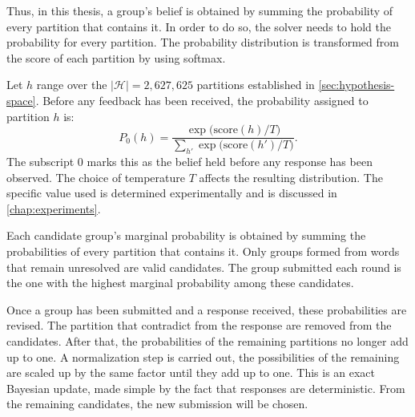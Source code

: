 Thus, in this thesis, a group's belief is obtained by summing the probability of every partition that contains it. In order to do so, the solver needs to hold the probability for every partition. The probability distribution is transformed from the score of each partition by using softmax.

Let $h$ range over the $|\mathcal{H}| = 2{,}627{,}625$ partitions established in \autoref{sec:hypothesis-space}. Before any feedback has been received, the probability assigned to partition $h$ is:
\begin{equation}
P_0(h) = \frac{\exp\big(\text{score}(h)/T\big)}{\sum_{h'} \exp\big(\text{score}(h')/T\big)}.
\label{eq:softmax-prior}
\end{equation}
The subscript $0$ marks this as the belief held before any response has been observed.
The choice of temperature $T$ affects the resulting distribution. The specific value used is determined experimentally and is discussed in \autoref{chap:experiments}.


Each candidate group's marginal probability is obtained by summing the probabilities of every partition that contains it. Only groups formed from words that remain unresolved are valid candidates. The group submitted each round is the one with the highest marginal probability among these candidates.

Once a group has been submitted and a response received, these probabilities are revised. The partition that contradict from the response are removed from the candidates. After that, the probabilities of the remaining partitions no longer add up to one. A normalization step is carried out, the possibilities of the remaining are scaled up by the same factor until they add up to one. This is an exact Bayesian update, made simple by the fact that responses are deterministic. From the remaining candidates, the new submission will be chosen.

